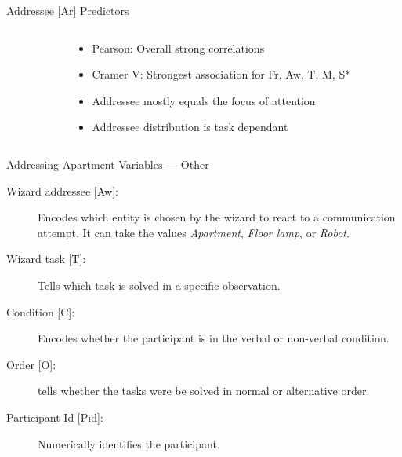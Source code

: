 \begin{frame}{Addressee [Ar] Predictors}
  \begin{columns}[T] %
    \begin{column}{.5\textwidth}
      \centering
      \vspace{-10pt}
    \end{column}
    \hspace{-.1\textwidth}
    \begin{column}{.6\textwidth}
      \begin{itemize}
        \item<1-> Pearson: Overall strong correlations
        \item<2-> Cramer V: Strongest association for Fr, Aw, T, M, S*
        \item<3-> Addressee mostly equals the focus of attention
        \item<4-> Addressee distribution is task dependant
      \end{itemize}
    \end{column}
  \end{columns}
\end{frame}
\begin{frame}{Addressing Apartment Variables --- Other}
  \begin{description}
      \item[{Wizard \gls{addressee} [Aw]:}] Encodes which entity is chosen by the \gls{wizard} to react to a communication attempt.
      It can take the values \emph{Apartment}, \emph{Floor lamp}, or \emph{Robot}.
      \item[{Wizard task [T]:}] Tells which task is solved in a specific observation.
      \item[{Condition [C]:}] Encodes whether the participant is in the verbal or non-verbal condition.
      \item[{Order [O]:}] tells whether the tasks were be solved in normal or alternative order.
      \item[{Participant Id [Pid]:}] Numerically identifies the participant.
  \end{description}
\end{frame}
